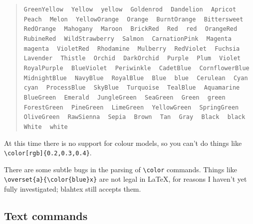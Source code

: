 \documentclass{article}
\newcommand{\texcommand}[1]{\textbackslash{}#1}
\newcommand{\spacer}{\,\,\, \hfil}
\newcommand{\lastspacer}{\hfill\hfill\hfill}
\newenvironment{mylist}{\begin{quote}}{\end{quote}}
\begin{document}
\begin{mylist}
\texttt{GreenYellow} \spacer
\texttt{Yellow} \spacer
\texttt{yellow} \spacer
\texttt{Goldenrod} \spacer
\texttt{Dandelion} \spacer
\texttt{Apricot} \spacer
\texttt{Peach} \spacer
\texttt{Melon} \spacer
\texttt{YellowOrange} \spacer
\texttt{Orange} \spacer
\texttt{BurntOrange} \spacer
\texttt{Bittersweet} \spacer
\texttt{RedOrange} \spacer
\texttt{Mahogany} \spacer
\texttt{Maroon} \spacer
\texttt{BrickRed} \spacer
\texttt{Red} \spacer
\texttt{red} \spacer
\texttt{OrangeRed} \spacer
\texttt{RubineRed} \spacer
\texttt{WildStrawberry} \spacer
\texttt{Salmon} \spacer
\texttt{CarnationPink} \spacer
\texttt{Magenta} \spacer
\texttt{magenta} \spacer
\texttt{VioletRed} \spacer
\texttt{Rhodamine} \spacer
\texttt{Mulberry} \spacer
\texttt{RedViolet} \spacer
\texttt{Fuchsia} \spacer
\texttt{Lavender} \spacer
\texttt{Thistle} \spacer
\texttt{Orchid} \spacer
\texttt{DarkOrchid} \spacer
\texttt{Purple} \spacer
\texttt{Plum} \spacer
\texttt{Violet} \spacer
\texttt{RoyalPurple} \spacer
\texttt{BlueViolet} \spacer
\texttt{Periwinkle} \spacer
\texttt{CadetBlue} \spacer
\texttt{CornflowerBlue} \spacer
\texttt{MidnightBlue} \spacer
\texttt{NavyBlue} \spacer
\texttt{RoyalBlue} \spacer
\texttt{Blue} \spacer
\texttt{blue} \spacer
\texttt{Cerulean} \spacer
\texttt{Cyan} \spacer
\texttt{cyan} \spacer
\texttt{ProcessBlue} \spacer
\texttt{SkyBlue} \spacer
\texttt{Turquoise} \spacer
\texttt{TealBlue} \spacer
\texttt{Aquamarine} \spacer
\texttt{BlueGreen} \spacer
\texttt{Emerald} \spacer
\texttt{JungleGreen} \spacer
\texttt{SeaGreen} \spacer
\texttt{Green} \spacer
\texttt{green} \spacer
\texttt{ForestGreen} \spacer
\texttt{PineGreen} \spacer
\texttt{LimeGreen} \spacer
\texttt{YellowGreen} \spacer
\texttt{SpringGreen} \spacer
\texttt{OliveGreen} \spacer
\texttt{RawSienna} \spacer
\texttt{Sepia} \spacer
\texttt{Brown} \spacer
\texttt{Tan} \spacer
\texttt{Gray} \spacer
\texttt{Black} \spacer
\texttt{black} \spacer
\texttt{White} \spacer
\texttt{white} \lastspacer
\end{mylist}

At this time there is no support for colour models, so you can't do things like \texttt{\texcommand{color}[rgb]\{0.2,0.3,0.4\}}.

There are some subtle bugs in the parsing of \texttt{\texcommand{color}} commands. Things like \texttt{\texcommand{overset}\{a\}\{\texcommand{color}\{blue\}x\}} are not legal in \LaTeX, for reasons I haven't yet fully investigated; blahtex still accepts them.

\subsection{Text commands}
\end{document}
